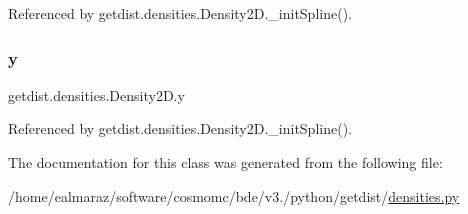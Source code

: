Referenced by getdist.\+densities.\+Density2\+D.\+\_\+init\+Spline().

\mbox{\label{classgetdist_1_1densities_1_1Density2D_a12719ab4e796cf011a7c17c201468ab1}} 
\subsubsection{\texorpdfstring{y}{y}}
{\footnotesize\ttfamily getdist.\+densities.\+Density2\+D.\+y}



Referenced by getdist.\+densities.\+Density2\+D.\+\_\+init\+Spline().



The documentation for this class was generated from the following file\+:\begin{DoxyCompactItemize}
\item 
/home/ealmaraz/software/cosmomc/bde/v3./python/getdist/\mbox{\hyperlink{densities_8py}{densities.\+py}}\end{DoxyCompactItemize}
